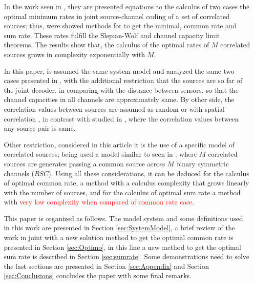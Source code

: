 \documentclass[journal]{IEEEtran}
\begin{document}
 In the work seen in \cite{fernando}, they are presented equations to the calculus of two cases the 
 optimal minimum rates in joint source-channel coding of a set of correlated sources;
 thus, were showed methods for to get the minimal,  common rate and  sum rate.
 These  rates fulfill the Slepian-Wolf 
 \cite{slepian} and channel capacity limit \cite{cover} theorems.
 The results show that, the calculus of 
 the optimal rates of $M$ correlated sources grows in complexity exponentially 
 with $M$.  
 
 In this paper, is assumed the same system 
 model and analyzed the same two cases presented 
 in \cite{fernando}, with the additional restriction that the 
 sources are so far of the joint decoder, in comparing with the distance 
 between sensors, so that the channel capacities in all channels are 
 approximately same. By other side, the correlation values between sources are
 assumed as random or with spatial correlation \cite{corrspatial},
 in contrast with studied in \cite{ceobinary1,ceobinary2}, where the correlation values
 between any source pair is same. 
 
 Other restriction, considered in this article it is the use of a specific model 
 of correlated sources; being used a model similar to seen
 in \cite{ceobinary1,ceobinary2}; where $M$
 correlated sources are generates passing a common source across $M$ binary 
 symmetric channels ($BSC$).
 Using all these considerations, it can be deduced for the calculus of optimal common rate, a method 
 with a calculus complexity that grows linearly with the number of sources, 
 and for the calculus of optimal sum rate a method with \textcolor{red}{very low complexity
 when compared of common rate case}. 
 
This paper is organized as follows. The model system and some definitions 
used in this work are presented in Section \ref{sec:SystemModel}, a brief review of the
work in \cite{fernando} joint with a new solution method to get the optimal 
common rate is presented in Section \ref{sec:Optimo}, in this line a new method to get
the optimal sum rate is described in Section \ref{sec:sumrate}. Some demonstrations
need to solve the last sections are presented in
Section \ref{sec:Appendix} and Section \ref{sec:Conclusions} concludes the paper 
with some final remarks.

\end{document}
